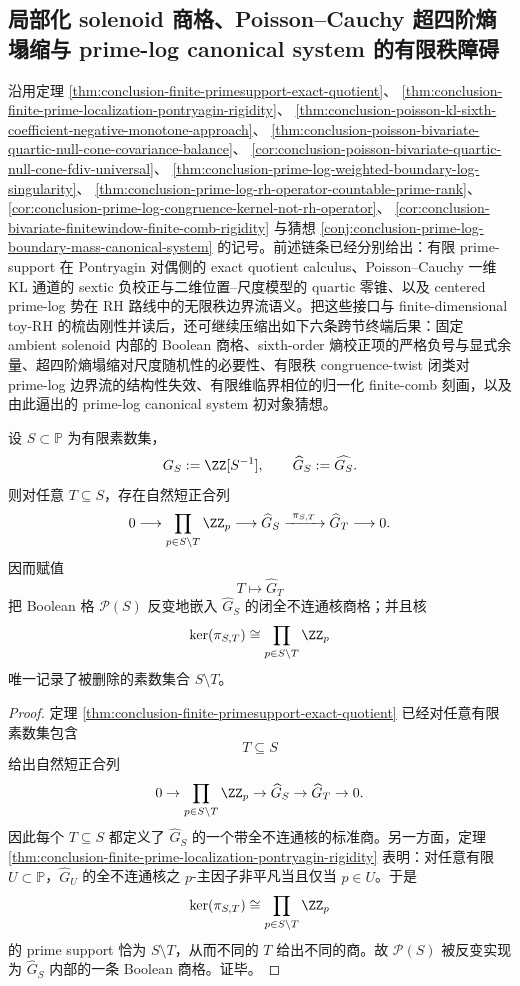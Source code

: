 \subsection{局部化 solenoid 商格、Poisson--Cauchy 超四阶熵塌缩与 prime-log canonical system 的有限秩障碍}\label{subsec:conclusion-solenoid-poissoncauchy-primelog-finitecomb-canonical-nogo}
沿用定理
\ref{thm:conclusion-finite-primesupport-exact-quotient}、
\ref{thm:conclusion-finite-prime-localization-pontryagin-rigidity}、
\ref{thm:conclusion-poisson-kl-sixth-coefficient-negative-monotone-approach}、
\ref{thm:conclusion-poisson-bivariate-quartic-null-cone-covariance-balance}、
\ref{cor:conclusion-poisson-bivariate-quartic-null-cone-fdiv-universal}、
\ref{thm:conclusion-prime-log-weighted-boundary-log-singularity}、
\ref{thm:conclusion-prime-log-rh-operator-countable-prime-rank}、
\ref{cor:conclusion-prime-log-congruence-kernel-not-rh-operator}、
\ref{cor:conclusion-bivariate-finitewindow-finite-comb-rigidity}
与猜想
\ref{conj:conclusion-prime-log-boundary-mass-canonical-system}
的记号。前述链条已经分别给出：有限 prime-support 在 Pontryagin 对偶侧的 exact quotient calculus、Poisson--Cauchy 一维 KL 通道的 sextic 负校正与二维位置--尺度模型的 quartic 零锥、以及 centered prime-log 势在 RH 路线中的无限秩边界流语义。把这些接口与 finite-dimensional toy-RH 的梳齿刚性并读后，还可继续压缩出如下六条跨节终端后果：固定 ambient solenoid 内部的 Boolean 商格、sixth-order 熵校正项的严格负号与显式余量、超四阶熵塌缩对尺度随机性的必要性、有限秩 congruence-twist 闭类对 prime-log 边界流的结构性失效、有限维临界相位的归一化 finite-comb 刻画，以及由此逼出的 prime-log canonical system 初对象猜想。

\begin{theorem}\label{thm:conclusion-solenoid-boolean-quotient-lattice}
设 \(S\subset \mathbb P\) 为有限素数集，
\[
G_S:=\ZZ[S^{-1}],
\qquad
\widehat G_S:=\widehat{G_S}.
\]
则对任意 \(T\subseteq S\)，存在自然短正合列
\[
0\longrightarrow \prod_{p\in S\setminus T}\ZZ_p
\longrightarrow \widehat G_S
\xrightarrow{\ \pi_{S,T}\ }
\widehat G_T
\longrightarrow 0.
\]
因而赋值
\[
T\longmapsto \widehat G_T
\]
把 Boolean 格 \(\mathcal P(S)\) 反变地嵌入 \(\widehat G_S\) 的闭全不连通核商格；并且核
\[
\ker(\pi_{S,T})\cong \prod_{p\in S\setminus T}\ZZ_p
\]
唯一记录了被删除的素数集合 \(S\setminus T\)。
\end{theorem}
\begin{proof}
定理 \ref{thm:conclusion-finite-primesupport-exact-quotient} 已经对任意有限素数集包含
\[
T\subseteq S
\]
给出自然短正合列
\[
0\to \prod_{p\in S\setminus T}\ZZ_p\to \widehat G_S\to \widehat G_T\to 0.
\]
因此每个 \(T\subseteq S\) 都定义了 \(\widehat G_S\) 的一个带全不连通核的标准商。另一方面，定理 \ref{thm:conclusion-finite-prime-localization-pontryagin-rigidity} 表明：对任意有限 \(U\subset \mathbb P\)，\(\widehat G_U\) 的全不连通核之 \(p\)-主因子非平凡当且仅当 \(p\in U\)。于是
\[
\ker(\pi_{S,T})\cong \prod_{p\in S\setminus T}\ZZ_p
\]
的 prime support 恰为 \(S\setminus T\)，从而不同的 \(T\) 给出不同的商。故 \(\mathcal P(S)\) 被反变实现为 \(\widehat G_S\) 内部的一条 Boolean 商格。证毕。
\end{proof}

